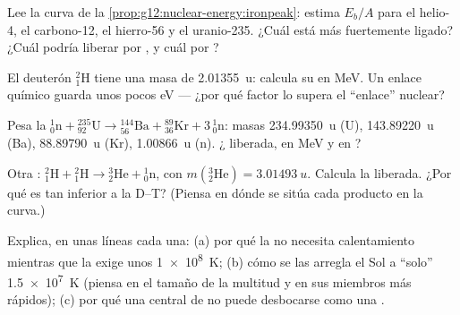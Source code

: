 \begin{exercise}[$\star$]\label{exo:g12:nuclear-energy:5}
Lee la curva de la \cref{prop:g12:nuclear-energy:ironpeak}: estima $E_b/A$ para el
helio-4, el carbono-12, el hierro-56 y el uranio-235. ¿Cuál está más fuertemente
ligado? ¿Cuál podría liberar  por , y cuál por ?
\end{exercise}

\begin{exercise}[$\star\star$]\label{exo:g12:nuclear-energy:6}
El deuterón ${}^{2}_{1}\mathrm{H}$ tiene una masa de \qty{2.01355}{u}: calcula su
 en \unit{MeV}. Un enlace químico guarda unos pocos \unit{eV} --- ¿por
qué factor lo supera el ``enlace'' nuclear?
\end{exercise}

\begin{exercise}[$\star\star$]\label{exo:g12:nuclear-energy:7}
Pesa la  ${}^{1}_{0}\mathrm{n} + {}^{235}_{92}\mathrm{U} \to
{}^{144}_{56}\mathrm{Ba} + {}^{89}_{36}\mathrm{Kr} + 3\,{}^{1}_{0}\mathrm{n}$: masas
\qty{234.99350}{u} (U), \qty{143.89220}{u} (Ba), \qty{88.89790}{u} (Kr),
\qty{1.00866}{u} (n). ¿ liberada, en \unit{MeV} y en ?
\end{exercise}

\begin{exercise}[$\star\star$]\label{exo:g12:nuclear-energy:8}
Otra : ${}^{2}_{1}\mathrm{H} + {}^{2}_{1}\mathrm{H} \to
{}^{3}_{2}\mathrm{He} + {}^{1}_{0}\mathrm{n}$, con
$m({}^{3}_{2}\mathrm{He}) = \qty{3.01493}{u}$. Calcula la  liberada. ¿Por qué
es tan inferior a la D--T? (Piensa en dónde se sitúa cada producto en la curva.)
\end{exercise}

\begin{exercise}[$\star\star$]\label{exo:g12:nuclear-energy:9}
Explica, en unas líneas cada una: (a) por qué la  no necesita calentamiento
mientras que la  exige unos \qty{1e8}{K}; (b) cómo se las arregla el Sol a
``solo'' \qty{1.5e7}{K} (piensa en el tamaño de la multitud y en sus miembros más
rápidos); (c) por qué una central de  no puede desbocarse como una .
\end{exercise}

